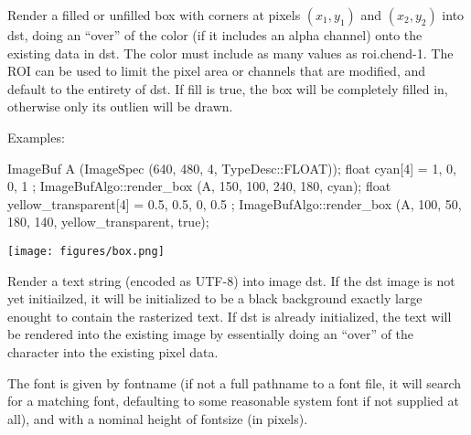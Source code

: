 Render a filled or unfilled box with corners at pixels $(x_1,y_1)$ and
$(x_2,y_2)$ into {\cf dst}, doing an ``over'' of the color (if it includes
an alpha channel) onto the existing data in {\cf dst}. The {\cf color} must
include as many values as {\cf roi.chend-1}. The ROI can be used to limit
the pixel area or channels that are modified, and default to the entirety of
{\cf dst}. If {\cf fill} is {\cf true}, the box will be completely filled in,
otherwise only its outlien will be drawn.

\smallskip
\noindent Examples:
\begin{code}
    ImageBuf A (ImageSpec (640, 480, 4, TypeDesc::FLOAT));
    float cyan[4] = { 1, 0, 0, 1 };
    ImageBufAlgo::render_box (A, 150, 100, 240, 180, cyan);
    float yellow_transparent[4] = { 0.5, 0.5, 0, 0.5 };
    ImageBufAlgo::render_box (A, 100, 50, 180, 140, yellow_transparent, true);
\end{code}

\spc \texttt{[image: figures/box.png]}  \\
\apiend


 

Render a text string (encoded as UTF-8) into image {\cf dst}. If the {\cf dst} image
is not yet initiailzed, it will be initialized to be a black background
exactly large enought to contain the rasterized text.  If {\cf dst} is already
initialized, the text will be rendered into the existing image by
essentially doing an ``over'' of the character into the existing pixel
data.

The font is given by {\cf fontname} (if not a full pathname to a font file, it
will search for a matching font, defaulting to some reasonable system
font if not supplied at all), and with a nominal height of {\cf fontsize} (in
pixels).

